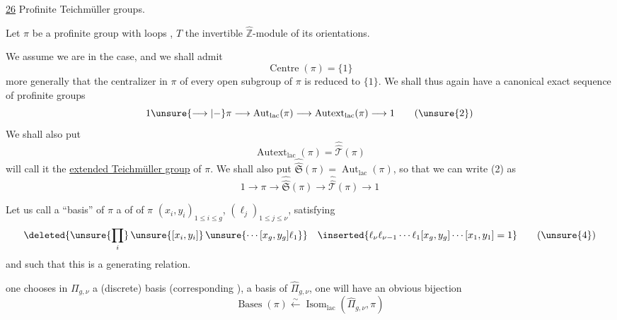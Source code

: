 

\uline{26} Profinite Teichmüller groups.


Let $\pi$ be a profinite group with loops , $T$ the invertible $\widehat{\mathbb Z}$-module of its orientations.

We assume we are in the  case, and we shall admit 
\[
\operatorname{Centre}(\pi)=\{1\}
\tag{1}
\]
more generally that the centralizer in $\pi$ of every open subgroup of $\pi$ is reduced to $\{1\}$. We shall thus again have a canonical exact sequence of profinite groups
\[
1 \unsure{\longrightarrow|{-}} \pi \longrightarrow \operatorname{Aut}_{\mathrm{lac}}(\pi) \longrightarrow \operatorname{Autext}_{\mathrm{lac}}(\pi) \longrightarrow 1
\tag{\unsure{2}}
\]
We shall also put 
\[
\operatorname{Autext}_{\mathrm{lac}}(\pi)=\widehat{\widehat{\mathcal T}}(\pi)
\tag{3}
\]
 will call it the \uline{extended Teichmüller group} of $\pi$. We shall also put $\widehat{\widehat{\mathfrak S}}(\pi)=\operatorname{Aut}_{\mathrm{lac}}(\pi)$, so that we can write (2) as
\[
1 \longrightarrow \pi \longrightarrow \widehat{\widehat{\mathfrak S}}(\pi) \longrightarrow \widehat{\widehat{\mathcal T}}(\pi) \longrightarrow 1
\tag{2'}
\]

Let us call a ``basis'' of $\pi$ a  of  of $\pi$ $(x_i,y_i)_{1\leq i\leq g}$, $(\ell_j)_{1\leq j\leq\nu}$,  satisfying
\[
\deleted{\unsure{\prod_i}\,\unsure{[x_i,y_i]}\,\unsure{\cdots[x_g,y_g]\ell_1}}
\quad
\inserted{\ell_\nu\ell_{\nu-1}\cdots\ell_1[x_g,y_g]\cdots[x_1,y_1]=1}
\tag{\unsure{4}}
\]
and such that this is a generating relation.




 one chooses in $\Pi_{g,\nu}$ a (discrete) basis (corresponding ),  a basis of $\widehat{\Pi}_{g,\nu}$, one will have an obvious bijection
\[
\operatorname{Bases}(\pi) \xleftarrow{\sim} \operatorname{Isom}_{\mathrm{lac}}(\widehat{\Pi}_{g,\nu},\pi)
\tag{5}
\]

